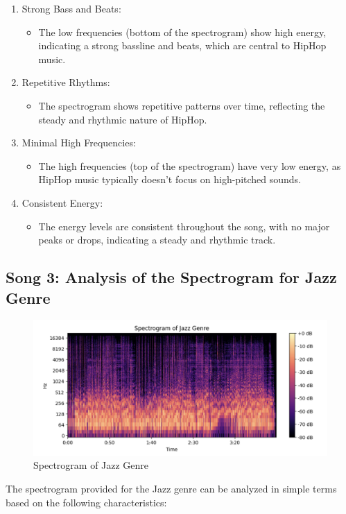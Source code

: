 \documentclass[a4paper,12pt]{article}
\begin{document}
\begin{enumerate}
    \item Strong Bass and Beats:
        \begin{itemize}
            \item The low frequencies (bottom of the spectrogram) show high energy, indicating a strong bassline and beats, which are central to HipHop music.  
        \end{itemize}
    \item Repetitive Rhythms:
        \begin{itemize}
            \item The spectrogram shows repetitive patterns over time, reflecting the steady and rhythmic nature of HipHop. 
        \end{itemize}
    \item Minimal High Frequencies:
        \begin{itemize}
            \item The high frequencies (top of the spectrogram) have very low energy, as HipHop music typically doesn’t focus on high-pitched sounds.   
        \end{itemize}
    \item Consistent Energy:
        \begin{itemize}
            \item The energy levels are consistent throughout the song, with no major peaks or drops, indicating a steady and rhythmic track.  
        \end{itemize}
\end{enumerate}
\newpage
\subsection{Song 3: Analysis of the Spectrogram for Jazz Genre}
\begin{figure}[H]
    \centering
    \includegraphics[width=1\linewidth]{4.png}
    \caption{Spectrogram of Jazz Genre}
\end{figure}
The spectrogram provided for the Jazz genre can be analyzed in simple terms based on the following characteristics:
\end{document}
